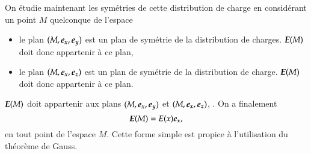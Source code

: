 \begin{corrige}
\begin{enumerate}
	   On étudie maintenant les symétries de cette distribution de charge 
	   en considérant un point $M$ quelconque de l'espace
	   \begin{itemize}
		   \item le plan $(M, \ex, \ey)$ est un plan de symétrie de 
			 la distribution de charges. $\vece(M)$ doit donc
			 appartenir à ce plan,
		   \item le plan $(M, \ex, \ez)$ est un plan de symétrie de la
			 distribution de charge. $\vece(M)$ doit donc appartenir
			 à ce plan.
	 \end{itemize}
	 $\vece(M)$ doit appartenir aux plans $(M, \ex, \ey)$ et $(M, \ex, \ez)$, 
	 . On a finalement
	 \begin{equation}
		 \vece(M) = E(x)\ex,
	 \end{equation}
	 en tout point de l'espace $M$. Cette forme simple est propice à 
	 l'utilisation du théorème de Gauss.


\end{enumerate}
\end{corrige}
